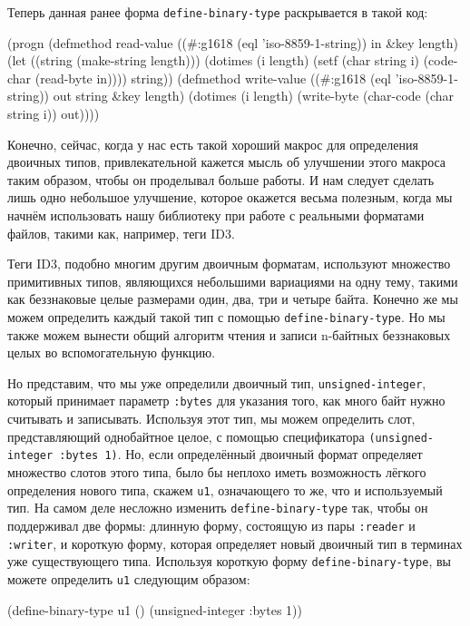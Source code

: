 Теперь данная ранее форма \lstinline{define-binary-type} раскрывается в такой код:

\begin{myverb}
(progn
  (defmethod read-value ((#:g1618 (eql 'iso-8859-1-string)) in &key length)
    (let ((string (make-string length)))
      (dotimes (i length)
        (setf (char string i) (code-char (read-byte in))))
      string))
  (defmethod write-value ((#:g1618 (eql 'iso-8859-1-string)) out string &key length)
    (dotimes (i length)
      (write-byte (char-code (char string i)) out))))
\end{myverb}

Конечно, сейчас, когда у нас есть такой хороший макрос для определения двоичных типов,
привлекательной кажется мысль об улучшении этого макроса таким образом, чтобы он
проделывал больше работы. И нам следует сделать лишь одно небольшое улучшение,
которое окажется весьма полезным, когда мы начнём использовать нашу библиотеку при работе
с реальными форматами файлов, такими как, например, теги ID3.

Теги ID3, подобно многим другим двоичным форматам, используют множество примитивных типов,
являющихся небольшими вариациями на одну тему, такими как беззнаковые целые размерами
один, два, три и четыре байта. Конечно же мы можем определить каждый такой тип с помощью
\lstinline{define-binary-type}. Но мы также можем вынести общий алгоритм чтения и записи
n-байтных беззнаковых целых во вспомогательную функцию.

Но представим, что мы уже определили двоичный тип, \lstinline{unsigned-integer}, который
принимает параметр \lstinline{:bytes} для указания того, как много байт нужно считывать и
записывать. Используя этот тип, мы можем определить слот, представляющий однобайтное целое,
с помощью спецификатора \lstinline{(unsigned-integer :bytes 1)}. Но, если определённый двоичный
формат определяет множество слотов этого типа, было бы неплохо иметь возможность лёгкого
определения нового типа, скажем \lstinline{u1}, означающего то же, что и используемый тип. На
самом деле несложно изменить \lstinline{define-binary-type} так, чтобы он поддерживал две
формы: длинную форму, состоящую из пары \lstinline{:reader} и \lstinline{:writer}, и короткую форму,
которая определяет новый двоичный тип в терминах уже су\-щест\-вую\-щего типа. Используя
короткую форму \lstinline{define-binary-type}, вы можете определить \lstinline{u1} следующим образом:

\begin{myverb}
(define-binary-type u1 () (unsigned-integer :bytes 1))
\end{myverb}

